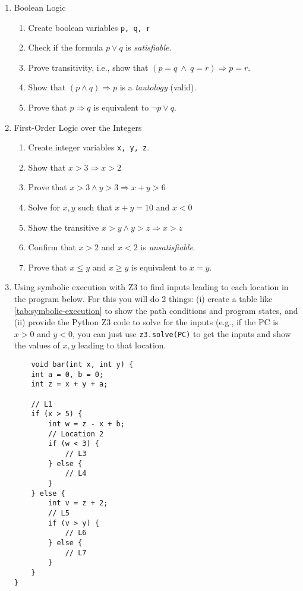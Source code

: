 \documentclass[oneside,11pt,dvipsnames]{book}
\renewcommand{\implies}{\Rightarrow}
\newcommand{\code}[1]{\texttt{#1}}
\begin{document}
\begin{enumerate}

    \item Boolean Logic
    \begin{enumerate}
    \item Create boolean variables \texttt{p, q, r}
    \item Check if the formula $p \lor q$ is \emph{satisfiable}.
    \item Prove transitivity, i.e., show that $(p = q ~\land ~q =r) \implies p = r$.
    \item Show that $(p \land q) \implies p$ is a \emph{tautology} (valid).
    \item Prove that $p \implies q$ is equivalent to $\neg p \lor  q$.
    \end{enumerate}


    \item First-Order Logic over the Integers 
    \begin{enumerate}
    \item Create integer variables \texttt{x, y, z}.
    \item Show that $x > 3 \implies x > 2$
    \item Prove that $x > 3 \land y > 3 \implies x + y > 6$
    \item Solve for $x, y$ such that $x + y = 10$ and $x < 0$
    \item Show the transitive $x > y \land y > z \implies x > z$
    \item Confirm that $x > 2$ and $x < 2$ is \emph{unsatisfiable}.
    \item Prove that $x \le y$ and $x \ge y$ is equivalent to $x = y$.
    \end{enumerate}
    \item Using symbolic execution with Z3 to find inputs leading to each location in the program below.  For this you will do 2 things: (i) create a table like \autoref{tab:symbolic-execution} to show the path conditions and program states, and (ii) provide the Python Z3 code to solve for the inputs (e.g., if the PC is $x > 0$ and $y < 0$, you can just use \code{z3.solve(PC)} to get the inputs and show the values of $x, y$ leading to that location.
    
    \begin{lstlisting}
    void bar(int x, int y) {
    int a = 0, b = 0;  
    int z = x + y + a; 
    
    // L1
    if (x > 5) {
        int w = z - x + b;  
        // Location 2
        if (w < 3) {
            // L3
        } else {
            // L4
        }
    } else {
        int v = z + 2;  
        // L5
        if (v > y) {
            // L6
        } else {
            // L7
        }
    }
}
    \end{lstlisting}

\end{enumerate}
\end{document}
